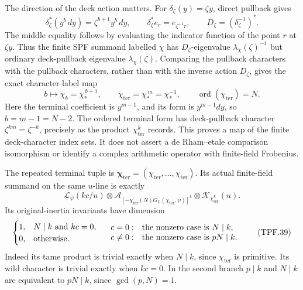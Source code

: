 The direction of the deck action matters. For
\(\delta_\zeta(y)=\zeta y\), direct pullback gives
\[
 \delta_\zeta^*(y^b\,dy)=\zeta^{b+1}y^b\,dy,\qquad
 \delta_\zeta^*e_r=e_{\zeta^{-1}r},\qquad
 D_\zeta=(\delta_\zeta^{-1})^* .
 \tag{TPF.36}\label{eq:TPF36}
\]
The middle equality follows by evaluating the
indicator function of the point \(r\) at \(\zeta y\).
Thus the finite SPF summand labelled \(\chi\) has
\(D_\zeta\)-eigenvalue \(\lambda_\chi(\zeta)^{-1}\)
but ordinary deck-pullback eigenvalue
\(\lambda_\chi(\zeta)\). Comparing the pullback
characters with the pullback characters, rather
than with the inverse action \(D_\zeta\), gives
the exact character-label map
\[
 b\longmapsto\chi_b=\chi_*^{\,b+1},\qquad
 \chi_{\mathrm{ter}}=\chi_*^{\,m}
                  =\chi_*^{-1},\qquad
 \operatorname{ord}(\chi_{\mathrm{ter}})=N .
 \tag{TPF.37}\label{eq:TPF37}
\]
Here the terminal coefficient is \(y^{m-1}\), and
its form is \(y^{m-1}dy\), so \(b=m-1=N-2\).
The ordered terminal form has deck-pullback character
\(\zeta^{km}=\zeta^{-k}\), precisely as the product
\(\chi_{\mathrm{ter}}^k\) records.
This proves a map of the finite deck-character
index sets. It does not assert a de Rham--etale
comparison isomorphism or identify a complex
arithmetic operator with finite-field Frobenius.

The repeated terminal tuple is
\(\boldsymbol\chi_{\mathrm{ter}}
=(\chi_{\mathrm{ter}},\ldots,\chi_{\mathrm{ter}})\).
Its actual finite-field summand on the same
\(u\)-line is exactly
\[
 \mathcal L_\psi(kc/u)\otimes
 \mathcal A_{\left[-\chi_{\mathrm{ter}}(N)
                    G_L(\chi_{\mathrm{ter}},\psi)\right]^k}
                  \otimes\mathcal K_{\chi_{\mathrm{ter}}^k}(u).
 \tag{TPF.38}\label{eq:TPF38}
\]
Its original-inertia invariants have dimension
\[
 \begin{cases}
 1,&N\mid k\ \hbox{and }kc=0,\\
 0,&\hbox{otherwise}.
 \end{cases}
 \quad
 \begin{array}{ll}
 c=0:&\text{the nonzero case is }N\mid k,\\
 c\ne0:&\text{the nonzero case is }pN\mid k.
 \end{array}
 \tag{TPF.39}\label{eq:TPF39}
\]
Indeed its tame product is trivial exactly when
\(N\mid k\), since \(\chi_{\mathrm{ter}}\) is primitive.
Its wild character is trivial exactly when \(kc=0\).
In the second branch \(p\mid k\) and \(N\mid k\)
are equivalent to \(pN\mid k\), since \(\gcd(p,N)=1\).

